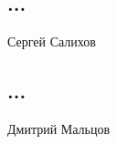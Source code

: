 \documentclass[main.tex]{subfiles}
\begin{document}
\subsection{...}
Сергей Салихов

\subsection{...}
Дмитрий Мальцов
\end{document}
